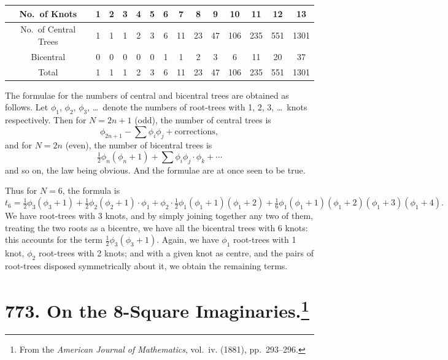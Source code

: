 \documentclass[11pt,a4paper]{book}
\begin{document}
\begin{center}
\begin{tabular}{c|ccccccccccccc}
\toprule
No.\ of Knots & 1 & 2 & 3 & 4 & 5 & 6 & 7 & 8 & 9 & 10 & 11 & 12 & 13 \\
\midrule
No.\ of Central Trees & 1 & 1 & 1 & 2 & 3 & 6 & 11 & 23 & 47 & 106 & 235 & 551 & 1301 \\
\quad\; Bicentral & 0 & 0 & 0 & 0 & 0 & 1 & 1 & 2 & 3 & 6 & 11 & 20 & 37 \\
\midrule
Total & 1 & 1 & 1 & 2 & 3 & 6 & 11 & 23 & 47 & 106 & 235 & 551 & 1301 \\
\bottomrule
\end{tabular}
\end{center}

The formulae for the numbers of central and bicentral trees are obtained as follows. Let $\phi_1$, $\phi_2$, $\phi_3$, \dots\ denote the numbers of root-trees with 1, 2, 3, \dots\ knots respectively. Then for $N = 2n + 1$ (odd), the number of central trees is
\[
\phi_{2n+1} - \sum \phi_i\phi_j + \text{corrections},
\]
and for $N = 2n$ (even), the number of bicentral trees is
\[
\tfrac{1}{2}\phi_n(\phi_n + 1) + \sum \phi_i\phi_j \cdot \phi_k + \dotsb
\]
and so on, the law being obvious. And the formulae are at once seen to be true.

Thus for $N = 6$, the formula is
\[
t_6 = \tfrac{1}{2}\phi_3(\phi_3 + 1) + \tfrac{1}{2}\phi_2(\phi_2 + 1)\cdot\phi_1 + \phi_2 \cdot \tfrac{1}{2}\phi_1(\phi_1 + 1)(\phi_1 + 2) + \tfrac{1}{6}\phi_1(\phi_1 + 1)(\phi_1 + 2)(\phi_1 + 3)(\phi_1 + 4).
\]
We have root-trees with 3 knots, and by simply joining together any two of them, treating the two roots as a bicentre, we have all the bicentral trees with 6 knots: this accounts for the term $\tfrac{1}{2}\phi_3(\phi_3 + 1)$. Again, we have $\phi_1$ root-trees with 1 knot, $\phi_2$ root-trees with 2 knots; and with a given knot as centre, and the pairs of root-trees disposed symmetrically about it, we obtain the remaining terms.

\newpage
\section[On the 8-Square Imaginaries]{773. On the 8-Square Imaginaries.\footnote{From the \textit{American Journal of Mathematics}, vol.~iv. (1881), pp.~293--296.}}
\end{document}
